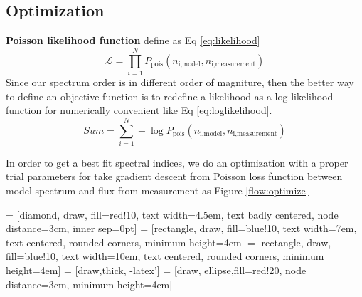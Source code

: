
\subsection{Optimization}

\par \textbf{Poisson likelihood function} define as Eq \ref{eq:likelihood}
\begin{equation}
    \mathcal{L} = \prod_{i=1}^{N} P_{\text{pois}}(n_{\text{i,model}}, n_{\text{i,measurement}})
    \label{eq:likelihood}
\end{equation}
Since our spectrum order is in different order of magniture, then the better way to define an objective function is to redefine a likelihood as a log-likelihood function for numerically convenient like Eq \ref{eq:loglikelihood}. 
\begin{equation}
    Sum = \sum_{i=1}^{N} -\log P_{\text{pois}}(n_{\text{i,model}}, n_{\text{i,measurement}})
    \label{eq:loglikelihood}
\end{equation}


\par In order to get a best fit spectral indices, we do an optimization with a proper trial parameters for take gradient descent from Poisson loss function between model spectrum and flux from measurement as Figure \ref{flow:optimize}


 = [diamond, draw, fill=red!10, 
    text width=4.5em, text badly centered, node distance=3cm, inner sep=0pt]
 = [rectangle, draw, fill=blue!10, 
    text width=7em, text centered, rounded corners, minimum height=4em]
 = [rectangle, draw, fill=blue!10, 
    text width=10em, text centered, rounded corners, minimum height=4em]
 = [draw,thick, -latex']
 = [draw, ellipse,fill=red!20, node distance=3cm,
    minimum height=4em]

